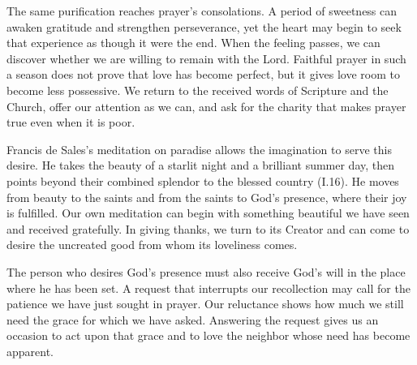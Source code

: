 The same purification reaches prayer's consolations. A period of sweetness can awaken gratitude and strengthen perseverance, yet the heart may begin to seek that experience as though it were the end. When the feeling passes, we can discover whether we are willing to remain with the Lord. Faithful prayer in such a season does not prove that love has become perfect, but it gives love room to become less possessive. We return to the received words of Scripture and the Church, offer our attention as we can, and ask for the charity that makes prayer true even when it is poor.

Francis de Sales's meditation on paradise allows the imagination to serve this desire. He takes the beauty of a starlit night and a brilliant summer day, then points beyond their combined splendor to the blessed country (I.16). He moves from beauty to the saints and from the saints to God's presence, where their joy is fulfilled. Our own meditation can begin with something beautiful we have seen and received gratefully. In giving thanks, we turn to its Creator and can come to desire the uncreated good from whom its loveliness comes.

The person who desires God's presence must also receive God's will in the place where he has been set. A request that interrupts our recollection may call for the patience we have just sought in prayer. Our reluctance shows how much we still need the grace for which we have asked. Answering the request gives us an occasion to act upon that grace and to love the neighbor whose need has become apparent.

